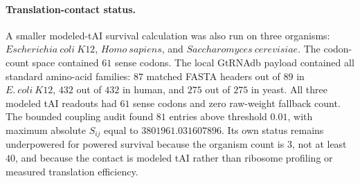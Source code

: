 \paragraph{Translation-contact status.}
A smaller modeled-tAI survival calculation was also run on three organisms: $Escherichia\ coli\ K12$, $Homo\ sapiens$, and $Saccharomyces\ cerevisiae$.  The codon-count space contained $61$ sense codons.  The local GtRNAdb payload contained all standard amino-acid families: $87$ matched FASTA headers out of $89$ in $E.\ coli\ K12$, $432$ out of $432$ in human, and $275$ out of $275$ in yeast.  All three modeled tAI readouts had $61$ sense codons and zero raw-weight fallback count.  The bounded coupling audit found $81$ entries above threshold $0.01$, with maximum absolute $S_{ij}$ equal to $3801961.031607896$.  Its own status remains underpowered for powered survival because the organism count is $3$, not at least $40$, and because the contact is modeled tAI rather than ribosome profiling or measured translation efficiency.

